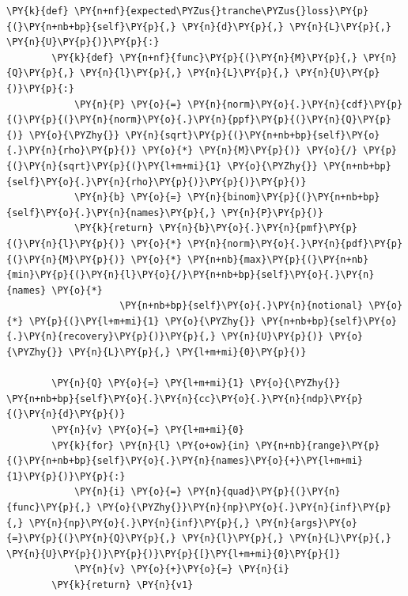 \begin{tcolorbox}[breakable, size=fbox, boxrule=1pt, pad at break*=1mm,colback=cellbackground, colframe=cellborder]
\begin{Verbatim}[commandchars=\\\{\}]
    \PY{k}{def} \PY{n+nf}{expected\PYZus{}tranche\PYZus{}loss}\PY{p}{(}\PY{n+nb+bp}{self}\PY{p}{,} \PY{n}{d}\PY{p}{,} \PY{n}{L}\PY{p}{,} \PY{n}{U}\PY{p}{)}\PY{p}{:}
        \PY{k}{def} \PY{n+nf}{func}\PY{p}{(}\PY{n}{M}\PY{p}{,} \PY{n}{Q}\PY{p}{,} \PY{n}{l}\PY{p}{,} \PY{n}{L}\PY{p}{,} \PY{n}{U}\PY{p}{)}\PY{p}{:}
            \PY{n}{P} \PY{o}{=} \PY{n}{norm}\PY{o}{.}\PY{n}{cdf}\PY{p}{(}\PY{p}{(}\PY{n}{norm}\PY{o}{.}\PY{n}{ppf}\PY{p}{(}\PY{n}{Q}\PY{p}{)} \PY{o}{\PYZhy{}} \PY{n}{sqrt}\PY{p}{(}\PY{n+nb+bp}{self}\PY{o}{.}\PY{n}{rho}\PY{p}{)} \PY{o}{*} \PY{n}{M}\PY{p}{)} \PY{o}{/} \PY{p}{(}\PY{n}{sqrt}\PY{p}{(}\PY{l+m+mi}{1} \PY{o}{\PYZhy{}} \PY{n+nb+bp}{self}\PY{o}{.}\PY{n}{rho}\PY{p}{)}\PY{p}{)}\PY{p}{)}
            \PY{n}{b} \PY{o}{=} \PY{n}{binom}\PY{p}{(}\PY{n+nb+bp}{self}\PY{o}{.}\PY{n}{names}\PY{p}{,} \PY{n}{P}\PY{p}{)}
            \PY{k}{return} \PY{n}{b}\PY{o}{.}\PY{n}{pmf}\PY{p}{(}\PY{n}{l}\PY{p}{)} \PY{o}{*} \PY{n}{norm}\PY{o}{.}\PY{n}{pdf}\PY{p}{(}\PY{n}{M}\PY{p}{)} \PY{o}{*} \PY{n+nb}{max}\PY{p}{(}\PY{n+nb}{min}\PY{p}{(}\PY{n}{l}\PY{o}{/}\PY{n+nb+bp}{self}\PY{o}{.}\PY{n}{names} \PY{o}{*} 
                    \PY{n+nb+bp}{self}\PY{o}{.}\PY{n}{notional} \PY{o}{*} \PY{p}{(}\PY{l+m+mi}{1} \PY{o}{\PYZhy{}} \PY{n+nb+bp}{self}\PY{o}{.}\PY{n}{recovery}\PY{p}{)}\PY{p}{,} \PY{n}{U}\PY{p}{)} \PY{o}{\PYZhy{}} \PY{n}{L}\PY{p}{,} \PY{l+m+mi}{0}\PY{p}{)}

        \PY{n}{Q} \PY{o}{=} \PY{l+m+mi}{1} \PY{o}{\PYZhy{}} \PY{n+nb+bp}{self}\PY{o}{.}\PY{n}{cc}\PY{o}{.}\PY{n}{ndp}\PY{p}{(}\PY{n}{d}\PY{p}{)}
        \PY{n}{v} \PY{o}{=} \PY{l+m+mi}{0}
        \PY{k}{for} \PY{n}{l} \PY{o+ow}{in} \PY{n+nb}{range}\PY{p}{(}\PY{n+nb+bp}{self}\PY{o}{.}\PY{n}{names}\PY{o}{+}\PY{l+m+mi}{1}\PY{p}{)}\PY{p}{:}
            \PY{n}{i} \PY{o}{=} \PY{n}{quad}\PY{p}{(}\PY{n}{func}\PY{p}{,} \PY{o}{\PYZhy{}}\PY{n}{np}\PY{o}{.}\PY{n}{inf}\PY{p}{,} \PY{n}{np}\PY{o}{.}\PY{n}{inf}\PY{p}{,} \PY{n}{args}\PY{o}{=}\PY{p}{(}\PY{n}{Q}\PY{p}{,} \PY{n}{l}\PY{p}{,} \PY{n}{L}\PY{p}{,} \PY{n}{U}\PY{p}{)}\PY{p}{)}\PY{p}{[}\PY{l+m+mi}{0}\PY{p}{]}
            \PY{n}{v} \PY{o}{+}\PY{o}{=} \PY{n}{i}
        \PY{k}{return} \PY{n}{v1}
		

\end{Verbatim}
\end{tcolorbox}
